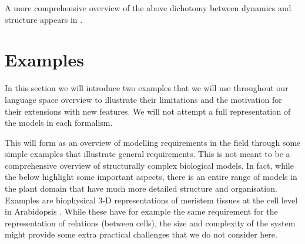 A more comprehensive overview of the above dichotomy between dynamics and
structure appears in \citet{fontana_barrier_1996}.




\section{Examples}
\label{sec:examples}
In this section we will introduce two examples that we will use throughout our
language space overview to illustrate their limitations and the motivation
for their extensions with new features. We will not attempt a full
representation of the models in each formalism.

This will form as an overview of modelling requirements in the field through
some simple examples that illustrate general requirements. This is not meant to
be a comprehensive overview of structurally complex biological models. In fact,
while the below highlight some important aspects, there is an entire range of
models in the plant domain that have much more detailed structure and
organisation. Examples are biophysical 3-D representations of meristem tissues
at the cell level in Arabidopsis \citep{gruel_epidermis-driven_2016,
  willis_cell_2016}. While these have for example the same requirement for the
representation of relations (\eg between cells), the size and complexity of the
system might provide some extra practical challenges that we do not consider
here.

